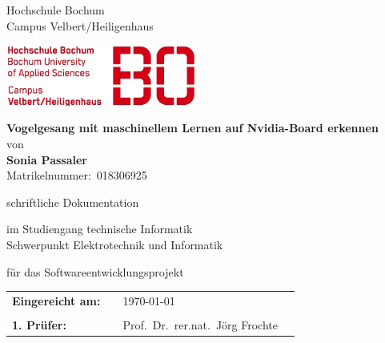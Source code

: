 \thispagestyle{empty}

\begin{minipage}[b]{0.55\textwidth}
\begin{center}
    {{Hochschule Bochum \\ Campus Velbert/Heiligenhaus}\par}
    \vspace{1.5ex}
    {{}\par}
\end{center}
\end{minipage}
\strut\hfill
  \includegraphics[height=2cm]{bilder/bologo}
  
\vspace*{1.6cm}
  \begin{center}
    \vspace{1.0cm}
	\Huge{\textbf{Vogelgesang mit maschinellem Lernen auf Nvidia-Board erkennen}}\\[2.5ex]
	\large{von} \\[2.5ex]
	\LARGE{\textbf{Sonia Passaler}}\\
	\Large{Matrikelnummer:~018306925}\\
	\vspace*{6ex}
    {\Large {schriftliche Dokumentation}\par}
    {\Large{im Studiengang technische Informatik\\Schwerpunkt Elektrotechnik und Informatik}\par}
    {\Large für das Softwareentwicklungsprojekt\\[\medskipamount]}
	\vspace*{2ex}
  \end{center}
  \vfill
 

\begin{flushleft}
\begin{tabular}{llll}
\textbf{Eingereicht am:} & & \today &\\
& & \\
\textbf{1. Prüfer:} & & Prof.~Dr.~rer.nat.~Jörg Frochte&\\%

\end{tabular}
\end{flushleft}